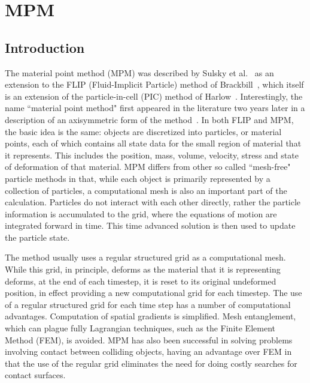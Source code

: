 

\chapter{MPM} \label{Sec:MPM}

\section{Introduction}

The material point method (MPM) was described by Sulsky et al.~\cite{sulskycmame,sulskycpc} as
an extension to the FLIP (Fluid-Implicit Particle) method of
Brackbill~\cite{brackbill-ruppel86}, which itself is an
extension of the particle-in-cell (PIC) method of
Harlow~\cite{harlow1963}.  Interestingly, the name ``material point method"
first appeared in the literature two years later in a description of
an axisymmetric form of the method~\cite{sulsky_axisym_1996}.  In both
FLIP and MPM, the basic idea is the same: objects are discretized into
particles, or material points, each of which contains all state data for the
small region of material that it represents.  This includes the position, mass, volume,
velocity, stress and state of deformation of that material.  MPM differs from
other so called ``mesh-free" particle methods in that, while each object
is primarily represented by a collection of particles, a computational mesh
is also an important part of the calculation.  Particles do not interact
with each other directly, rather the particle information is accumulated
to the grid, where the equations of motion are integrated forward in time.
This time advanced solution is then used to update the particle state.

The method usually uses a regular structured grid as a computational mesh.
While this grid, in principle, deforms as the material that it is representing
deforms, at the end of each timestep, it is reset to its original undeformed
position, in effect providing a new computational grid for each timestep.
The use of a regular structured grid for each time step has a number of
computational advantages.  Computation of spatial gradients is simplified.
Mesh entanglement, which can plague fully Lagrangian techniques, such as
the Finite Element Method (FEM), is avoided.  MPM has also been successful
in solving problems involving contact between colliding objects, having an
advantage over FEM in that the use of the regular grid eliminates the
need for doing costly searches for contact surfaces\cite{bard}.

